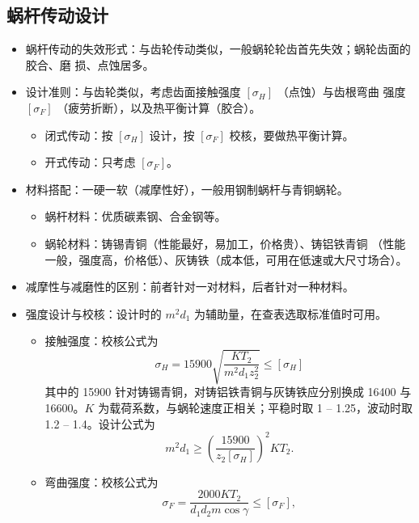 \documentclass[12pt,a4paper]{article}
\newcommand{\tightlist}{\setlength{\parskip}{0pt}\setlength{\itemsep}{0pt}}
\newcommand{\hint}[1]{\textsf{（#1）}}
\newcommand{\minor}[1]{{\color{gray} #1}}
\begin{document}
\subsection{蜗杆传动设计}
\begin{itemize}\tightlist
    \item 蜗杆传动的失效形式：与齿轮传动类似，一般蜗轮轮齿首先失效；蜗轮齿面的胶合、磨
    损、点蚀居多。
    \item 设计准则：与齿轮类似，考虑齿面接触强度 $[\sigma_H]$ \hint{点蚀}与齿根弯曲
    强度 $[\sigma_F]$ \hint{疲劳折断}，以及热平衡计算\hint{胶合}。
    \begin{itemize}\tightlist
        \item 闭式传动：按 $[\sigma_H]$ 设计，按 $[\sigma_F]$ 校核，要做热平衡计算。
        \item 开式传动：只考虑 $[\sigma_F]$。
    \end{itemize}
    \item 材料搭配：一硬一软\hint{减摩性好}，一般用钢制蜗杆与青铜蜗轮。
    \begin{itemize}\tightlist
        \item \minor{蜗杆材料：优质碳素钢、合金钢等。}
        \item \minor{蜗轮材料：铸锡青铜\hint{性能最好，易加工，价格贵}、铸铝铁青铜
        \hint{性能一般，强度高，价格低}、灰铸铁\hint{成本低，可用在低速或大尺寸场合}。}
    \end{itemize}
    \item 减摩性与减磨性的区别：前者针对一对材料，后者针对一种材料。
    \item 强度设计与校核：设计时的 $m^2d_1$ 为辅助量，在查表选取标准值时可用。
    \begin{itemize}\tightlist
        \item 接触强度：校核公式为
        \begin{equation}
        \sigma_H=15900\sqrt{\frac{KT_2}{m^2d_1z_2^2}}\leq[\sigma_H]
        \end{equation}
        \minor{其中的 15900 针对铸锡青铜，对铸铝铁青铜与灰铸铁应分别换成 16400 与
        16600。}$K$ 为载荷系数，与蜗轮速度正相关；平稳时取 1 -- 1.25，波动时取 1.2
        -- 1.4。设计公式为
        \begin{equation}
        m^2d_1\geq\left(\frac{15900}{z_2[\sigma_H]}\right)^2KT_2.
        \end{equation}
        \item 弯曲强度：校核公式为
        \begin{equation}
        \sigma_F=\frac{2000KT_2}{d_1d_2m\cos\gamma}\leq[\sigma_F],

\end{equation}
\end{itemize}
\end{itemize}
\end{document}
